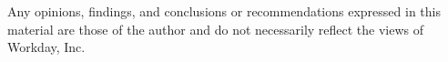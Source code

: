 \documentclass[sigplan,10pt,review,anonymous]{acmart}\settopmatter{printfolios=true}
\begin{document}
\begin{acks}                            %
 Any opinions, findings, and
  conclusions or recommendations expressed in this material are those
  of the author and do not necessarily reflect the views of Workday, Inc.
\end{acks}






\end{document}
